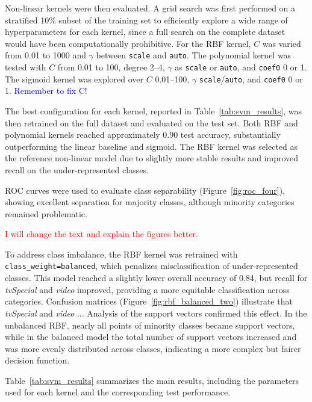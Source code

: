 Non-linear kernels were then evaluated. 
A grid search was first performed on a stratified 10\% subset of the training set to efficiently explore a wide range of hyperparameters for each kernel, 
since a full search on the complete dataset would have been computationally prohibitive. 
For the RBF kernel, $C$ was varied from 0.01 to 1000 and $\gamma$ between \texttt{scale} and \texttt{auto}. 
The polynomial kernel was tested with $C$ from 0.01 to 100, degree 2--4, $\gamma$ as \texttt{scale} or \texttt{auto}, and \texttt{coef0} 0 or 1. 
The sigmoid kernel was explored over $C$ 0.01--100, $\gamma$ \texttt{scale}/\texttt{auto}, and \texttt{coef0} 0 or 1. 
\textcolor{blue}{Remember to fix C!}

The best configuration for each kernel, reported in Table~\ref{tab:svm_results}, was then retrained on the full dataset and evaluated on the test set. 
Both RBF and polynomial kernels reached approximately 0.90 test accuracy, substantially outperforming the linear baseline and sigmoid. 
The RBF kernel was selected as the reference non-linear model due to slightly more stable results and improved recall on the under-represented classes.


ROC curves were used to evaluate class separability (Figure~\ref{fig:roc_four}),
showing excellent separation for majority classes, although minority categories remained problematic. 

\textcolor{red}{I will change the text and explain the figures better.}

To address class imbalance, the RBF kernel was retrained with \texttt{class\_weight=balanced}, 
which penalizes misclassification of under-represented classes. 
This model reached a slightly lower overall accuracy of 0.84, 
but recall for \textit{tvSpecial} and \textit{video} improved, providing a more equitable classification across categories.  
Confusion matrices (Figure~\ref{fig:rbf_balanced_two}) 
illustrate that \textit{tvSpecial} and \textit{video} ...  
Analysis of the support vectors confirmed this effect. 
In the unbalanced RBF, nearly all points of minority classes became support vectors, 
while in the balanced model the total number of support vectors increased and was more evenly distributed across classes, 
indicating a more complex but fairer decision function. 

Table~\ref{tab:svm_results} summarizes the main results, including the parameters used for each kernel and the corresponding test performance. 


